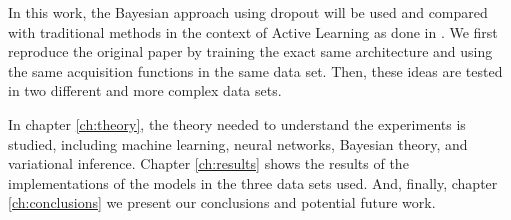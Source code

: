 In this work, the Bayesian approach using dropout will be used and compared with traditional methods in the context of Active Learning as done in \cite{Gal2016Active}. We first reproduce the original paper by training the exact same architecture and using the same acquisition functions in the same data set. Then, these ideas are tested in two different and more complex data sets.

In chapter \ref{ch:theory}, the theory needed to understand the experiments is studied, including machine learning, neural networks, Bayesian theory, and variational inference. Chapter \ref{ch:results} shows the results of the implementations of the models in the three data sets used. And, finally, chapter \ref{ch:conclusions} we present our conclusions and potential future work.
